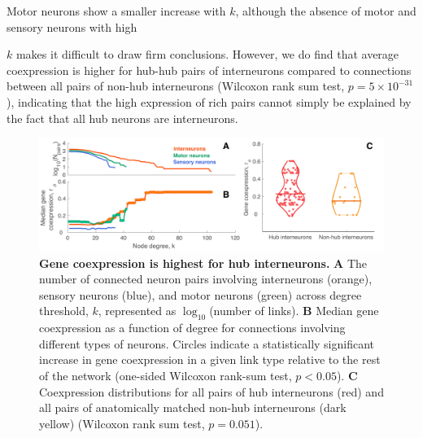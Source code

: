 \documentclass[10pt,letterpaper]{article}
\begin{document}
Motor neurons show a smaller increase with $k$, although the absence of motor and sensory neurons with high {$k$ makes it difficult to draw firm conclusions.
However, we do find that average coexpression is higher for hub-hub pairs of interneurons compared to connections between all pairs of non-hub interneurons (Wilcoxon rank sum test, $p = 5 \times 10^{-31}$), indicating that the high expression of rich pairs cannot simply be explained by the fact that all hub neurons are interneurons.

\begin{figure}[h]
\centering
   \includegraphics[width=1\textwidth]{Type_Degree5.pdf}
 \caption{
\textbf{Gene coexpression is highest for hub interneurons.}
\textbf{A} The number of connected neuron pairs involving interneurons (orange), sensory neurons (blue), and motor neurons (green) across degree threshold, $k$, represented as $\log_{10}$(number of links).
\textbf{B} Median gene coexpression as a function of degree for connections involving different types of neurons.
Circles indicate a statistically significant increase in gene coexpression in a given link type relative to the rest of the network (one-sided Wilcoxon rank-sum test, $p < 0.05$).
\textbf{C} Coexpression distributions for all pairs of hub interneurons (red) and all pairs of anatomically matched non-hub interneurons (dark yellow) (Wilcoxon rank sum test, $p = 0.051$).
}
 \label{fig:interneuron_dep}
\end{figure}

}
\end{document}
